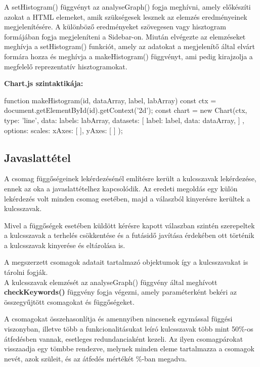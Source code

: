 A setHistogram() függvényt az analyseGraph() fogja meghívni, amely előkészíti azokat a HTML elemeket, amik szükségesek lesznek az elemzés eredményeinek megjelenítésére. A különböző eredményeket szövegesen vagy hisztogram formájában fogja megjeleníteni a Sidebar-on. Miután elvégezte az elemzéseket meghívja a setHistogram() funkciót, amely az adatokat a megjelenítő által elvárt formára hozza és meghívja a makeHistogram() függvényt, ami pedig kirajzolja a megfelelő reprezentatív hisztogramokat. 

\pagebreak
 
\noindent\textbf{Chart.js szintaktikája:}
 
\begin{js}
function makeHistogram(id, dataArray, label, labArray){
	const ctx = document.getElementById(id).getContext('2d');
	const chart = new Chart(ctx, {
		type: 'line',
		data: {
			labels: labArray,
			datasets: [{
				label: label,
				data: dataArray,
			}]
		},
		options: {
			scales: {
				xAxes: [{
				}],
				yAxes: [{
				}]
			}
		}
	});
}	
\end{js}

\subsection{Javaslattétel}

A csomag függőségeinek lekérdezésénél említésre került a kulcsszavak lekérdezése, ennek az oka a javaslattételhez kapcsolódik. Az eredeti megoldás egy külön lekérdezés volt minden csomag esetében, majd a válaszból kinyerésre kerültek a kulcsszavak. 

Mivel a függőségek esetében küldött kérésre kapott válaszban szintén szerepeltek a kulcsszavak a terhelés csökkentése és a futásidő javítása érdekében ott történik a kulcsszavak kinyerése és eltárolása is.

A megszerzett csomagok adatait tartalmazó objektumok így a kulcsszavakat is tárolni fogják.\\

A kulcsszavak elemzését az analyseGraph() függvény által meghívott \textbf{checkKeywords()} függvény fogja végezni, amely paraméterként bekéri az összegyűjtött csomagokat és függőségeket.

A csomagokat összehasonlítja és amennyiben nincsenek egymással függési viszonyban, illetve több a funkcionalitásukat leíró kulcsszavak több mint 50\%-os átfedésben vannak, esetleges redundanciaként kezeli.
Az ilyen csomagpárokat visszaadja egy tömbbe rendezve, melynek minden eleme tartalmazza a csomagok nevét, azok szüleit, és az átfedés mértékét \%-ban megadva.

